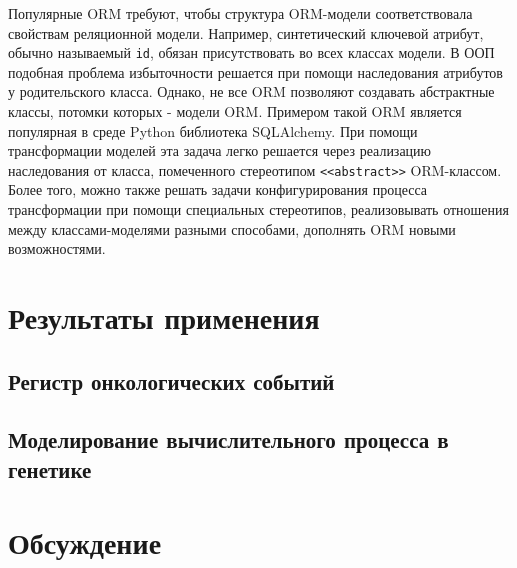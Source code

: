 \documentclass[12pt]{article}
\begin{document}
Популярные ORM требуют, чтобы структура ORM-модели соответствовала свойствам реляционной модели.  Например, синтетический ключевой атрибут, обычно называемый \texttt{id}, обязан присутствовать во всех классах модели.  В ООП подобная проблема избыточности решается при помощи наследования атрибутов у родительского класса. Однако, не все ORM позволяют создавать абстрактные классы, потомки которых - модели ORM.  Примером такой ORM является популярная в среде Python библиотека SQLAlchemy.  При помощи трансформации моделей эта задача легко решается через реализацию наследования от класса, помеченного стереотипом \texttt{<<abstract>>} ORM-классом.  Более того, можно также решать задачи конфигурирования процесса трансформации при помощи специальных стереотипов, реализовывать отношения между классами-моделями разными способами, дополнять ORM новыми возможностями.

\section{Результаты применения}

\subsection{Регистр онкологических событий}
\subsection{Моделирование вычислительного процесса в генетике}

\section{Обсуждение}
\label{sec:rel}
\end{document}

